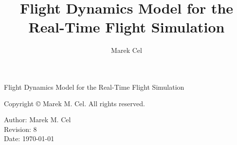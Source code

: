 \documentclass[12pt,a4paper]{report}
\title{Flight Dynamics Model for the Real-Time Flight Simulation}
\author{Marek Cel}
\date{}
\begin{document}
  
  \begin{titlepage}
    \centering
    {\huge Flight Dynamics Model for the Real-Time Flight Simulation\par}
  \end{titlepage}
  

  \noindent Copyright \copyright{} \the\year{} Marek M. Cel. All rights reserved.

  \noindent Author: Marek M. Cel \\
  Revision: 8 \\
  Date: \today

  
  
  {
    \clearpage
    \setlength{\parskip}{0em}
    \tableofcontents
  }

  
  
  
  
  \clearpage
   
  
  
\end{document}
